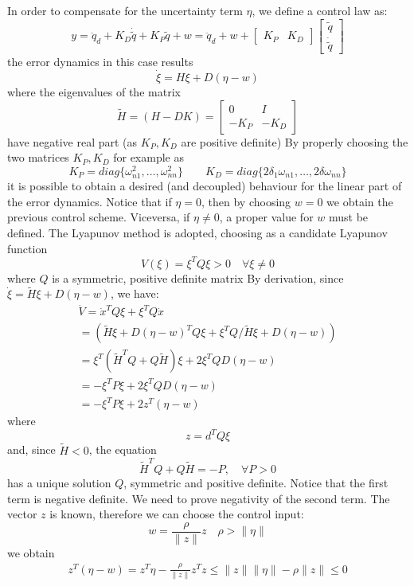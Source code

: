 \documentclass{book}
\begin{document}
In order to compensate for the uncertainty term $\eta$, we define a control law as:
\[
    y = \ddot{q}_d +K_D\dot{\tilde{q}} + K_P\tilde{q}+w = \ddot{q}_d + w + \begin{bmatrix}
        K_P & K_D
    \end{bmatrix} \begin{bmatrix}
    \tilde{q} \\ \dot{\tilde{q}}
    \end{bmatrix}
\]
the error dynamics in this case results
\[
    \dot{\xi} = H \xi + D(\eta-w)
\]
where the eigenvalues of the matrix
\[
    \tilde{H}= (H-DK) = \begin{bmatrix}
        0 & I \\ -K_P & -K_D
    \end{bmatrix}
\]
have negative real part (as $K_P,K_D$ are positive definite)
By properly choosing the two matrices $K_P,K_D$ for example as 
\[
    K_P = diag\{\omega_{n1}^2,\dots,\omega_{nn}^2\} \qquad K_D = diag\{2\delta_1\omega_{n1},\dots,2\delta\omega_{nn}\} 
\]
it is possible to obtain a desired (and decoupled) behaviour for the linear part of the error dynamics. Notice that if $\eta=0$, then by choosing $w=0$ we obtain the previous control scheme. Viceversa, if $\eta\neq 0$, a proper value for $w$ must be defined. The Lyapunov method is adopted, choosing as a candidate Lyapunov function
\[
    V(\xi)=\xi^TQ\xi>0 \quad \forall \xi \neq 0
\]
where $Q$ is a symmetric, positive definite matrix
By derivation, since $\dot{\xi}=\tilde{H}\xi+D(\eta-w)$, we have:
\begin{gather*}
    \dot{V} = \dot{x}^TQ\xi+\xi^TQ\dot{x}\\
    =(\tilde{H}\xi+D(\eta-w)^TQ\xi+\xi^TQ/\tilde{H}\xi+D(\eta-w))\\
    =\xi^T(\tilde{H}^TQ+Q\tilde{H})\xi+2\xi^TQD(\eta-w)\\
    =-\xi^TP\xi+2\xi^TQD(\eta-w)\\
    =-\xi^TP\xi+2z^T(\eta-w)
\end{gather*}
where\[
    z=d^TQ\xi
\]
and, since $\tilde{H}<0$, the equation 
\[
    \tilde{H}^TQ+Q\tilde{H}=-P, \quad \forall P>0
\]
has a unique solution $Q$, symmetric and positive definite. 
Notice that the first term is negative definite. We need to prove negativity of the second term. The vector $z$ is known, therefore we can choose the control input:
\[
    w=\displaystyle\frac{\rho}{\|z\|}z \quad \rho>\|\eta\|
\]
we obtain
\begin{gather*}
    z^T(\eta-w)=z^T\eta-\displaystyle\frac{\rho}{\|z\|}z^Tz \leq \|z\|\|\eta\|-\rho\|z\| \leq 0
\end{gather*}
\end{document}
